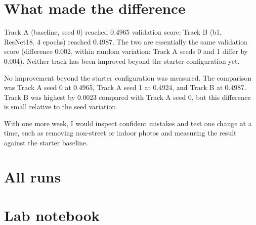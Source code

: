 \documentclass[11pt]{article}
\begin{document}
\section*{What made the difference}

Track A (baseline, seed 0) reached 0.4965 validation score; Track B (b1,
ResNet18, 4 epochs) reached 0.4987. The two are essentially the same
validation score (difference 0.002, within random variation: Track A seeds 0
and 1 differ by 0.004). Neither track has been improved beyond the starter
configuration yet.

No improvement beyond the starter configuration was measured. The comparison was Track A seed 0 at 0.4965, Track A seed 1 at 0.4924, and Track B at 0.4987. Track B was highest by 0.0023 compared with Track A seed 0, but this difference is small relative to the seed variation.

With one more week, I would inspect confident mistakes and test one change at a time, such as removing non-street or indoor photos and measuring the result against the starter baseline.

\section*{All runs}

\section*{Lab notebook}
\end{document}
